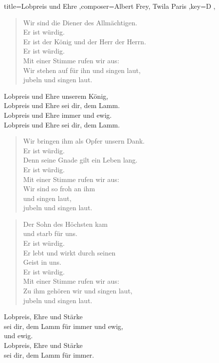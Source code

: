 \documentclass[]{leadsheet}
\begin{document}
\begin{song}{title={Lobpreis und Ehre
},composer={Albert Frey, Twila Paris
},key={D
},}
\begin{verse}
Wir sind die Diener des Allmächtigen. \\
Er ist würdig. \\
Er ist der König und der Herr der Herrn. \\
Er ist würdig. \\
Mit einer Stimme rufen wir aus: \\
Wir stehen auf für ihn und singen laut, \\
jubeln und singen laut. \\
\end{verse}

\begin{chorus}
Lobpreis und Ehre unserem König, \\
Lobpreis und Ehre sei dir, dem Lamm. \\
Lobpreis und Ehre immer und ewig. \\
Lobpreis und Ehre sei dir, dem Lamm. \\
\end{chorus}

\begin{verse}
Wir bringen ihm als Opfer unsern Dank. \\
Er ist würdig. \\
Denn seine Gnade gilt ein Leben lang. \\
Er ist würdig. \\
Mit einer Stimme rufen wir aus: \\
Wir sind so froh an ihm \\
und singen laut, \\
jubeln und singen laut. \\
\end{verse}

\begin{verse}
Der Sohn des Höchsten kam \\
und starb für uns. \\
Er ist würdig. \\
Er lebt und wirkt durch seinen \\
Geist in uns. \\
Er ist würdig. \\
Mit einer Stimme rufen wir aus: \\
Zu ihm gehören wir und singen laut, \\
jubeln und singen laut. \\
\end{verse}

\begin{bridge}
Lobpreis, Ehre und Stärke \\
sei dir, dem Lamm für immer und ewig, \\
und ewig. \\
Lobpreis, Ehre und Stärke \\
sei dir, dem Lamm für immer. \\
\end{bridge}

\end{song}
\end{document}
